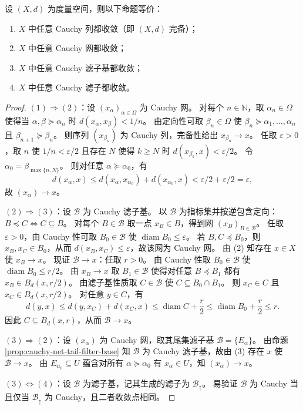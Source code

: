 \documentclass[lang=cn,a4paper,newtx,figureplace=section,tableplace=section]{elegantbook}
\begin{document}
\begin{theorem}\label{thm:completeness-equivalences}
  设 $(X,d)$ 为度量空间，则以下命题等价：
  \begin{enumerate}
    \item $X$ 中任意 Cauchy 列都收敛（即 $(X,d)$ 完备）；
    \item $X$ 中任意 Cauchy 网都收敛；
    \item $X$ 中任意 Cauchy 滤子基都收敛；
    \item $X$ 中任意 Cauchy 滤子都收敛。
  \end{enumerate}
\end{theorem}
\begin{proof}
  $(1)\Rightarrow(2)$：设 $(x_\alpha)_{\alpha\in\Omega}$ 为 Cauchy 网。
  对每个 $n\in\mathbb N$，取 $\alpha_n\in\Omega$ 使得当 $\alpha,\beta\succeq\alpha_n$ 时 $d(x_\alpha,x_\beta)<1/n$。
  由定向性可取 $\beta_n\in\Omega$ 使 $\beta_n\succeq\alpha_1,\dots,\alpha_n$ 且 $\beta_{n+1}\succeq\beta_n$。
  则序列 $(x_{\beta_n})$ 为 Cauchy 列，完备性给出 $x_{\beta_n}\to x$。
  任取 $\varepsilon>0$，取 $n$ 使 $1/n<\varepsilon/2$ 且存在 $N$ 使得 $k\ge N$ 时 $d(x_{\beta_k},x)<\varepsilon/2$。
  令 $\alpha_0=\beta_{\max\{n,N\}}$。
  则对任意 $\alpha\succeq\alpha_0$，有
  \[
    d(x_\alpha,x)\le d(x_\alpha,x_{\alpha_0})+d(x_{\alpha_0},x)<\varepsilon/2+\varepsilon/2=\varepsilon,
  \]
  故 $(x_\alpha)\to x$。

  $(2)\Rightarrow(3)$：设 $\mathcal B$ 为 Cauchy 滤子基。
  以 $\mathcal B$ 为指标集并按逆包含定向：$B\preceq C\iff C\subseteq B$。
  对每个 $B\in\mathcal B$ 取一点 $x_B\in B$，得到网 $(x_B)_{B\in\mathcal B}$。
  任取 $\varepsilon>0$，由 Cauchy 性可取 $B_0\in\mathcal B$ 使 $\operatorname{diam}B_0\le\varepsilon$。
  若 $B,C\preceq B_0$，则 $x_B,x_C\in B_0$，从而 $d(x_B,x_C)\le\varepsilon$，故该网为 Cauchy 网。
  由 (2) 知存在 $x\in X$ 使 $x_B\to x$。
  现证 $\mathcal B\to x$：任取 $r>0$。
  由 Cauchy 性取 $B_0\in\mathcal B$ 使 $\operatorname{diam}B_0\le r/2$。
  由 $x_B\to x$ 取 $B_1\in\mathcal B$ 使得对任意 $B\preceq B_1$ 都有 $x_B\in B_d(x,r/2)$。
  由滤子基性质取 $C\in\mathcal B$ 使 $C\subseteq B_0\cap B_1$。
  则 $x_C\in C$ 且 $x_C\in B_d(x,r/2)$。
  对任意 $y\in C$，有
  \[
    d(y,x)\le d(y,x_C)+d(x_C,x)\le \operatorname{diam}C+\frac{r}{2}\le \operatorname{diam}B_0+\frac{r}{2}\le r.
  \]
  因此 $C\subseteq B_d(x,r)$，从而 $\mathcal B\to x$。

  $(3)\Rightarrow(2)$：设 $(x_\alpha)$ 为 Cauchy 网，取其尾集滤子基 $\mathcal B=\{E_\alpha\}$。
  由命题 \ref{prop:cauchy-net-tail-filter-base} 知 $\mathcal B$ 为 Cauchy 滤子基，故由 (3) 存在 $x$ 使 $\mathcal B\to x$。
  由 $E_{\alpha_0}\subseteq U$ 蕴含对所有 $\alpha\succeq\alpha_0$ 有 $x_\alpha\in U$，知 $(x_\alpha)\to x$。

  $(3)\Leftrightarrow(4)$：设 $\mathcal B$ 为滤子基，记其生成的滤子为 $\mathcal B_{\uparrow}$。
  易验证 $\mathcal B$ 为 Cauchy 当且仅当 $\mathcal B_{\uparrow}$ 为 Cauchy，且二者收敛点相同。
\end{proof}
\end{document}
